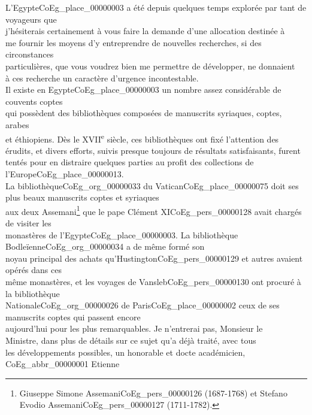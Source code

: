 \documentclass{book}
\begin{document}
\indent L’Egypte\gls{CoEg_place_00000003} a été depuis quelques temps explorée par tant de voyageurs que\\
j’hésiterais certainement à vous faire la demande d’une allocation destinée à\\
me fournir les moyens d’y entreprendre de nouvelles recherches, si des circonstances\\
particulières, que vous voudrez bien me permettre de développer, ne donnaient\\
à ces recherche un caractère d’urgence incontestable.\\
\indent Il existe en Egypte\gls{CoEg_place_00000003} un nombre assez considérable de couvents coptes\\
qui possèdent des bibliothèques composées de manuscrits syriaques, coptes, arabes\\
et éthiopiens. Dès le XVII\textsuperscript{e} siècle, ces bibliothèques ont fixé l’attention des\\
érudits, et divers efforts, suivis presque toujours de résultats satisfaisants, furent\\
tentés pour en distraire quelques parties au profit des collections de l’Europe\gls{CoEg_place_00000013}.\\
La bibliothèque\gls{CoEg_org_00000033} du Vatican\gls{CoEg_place_00000075} doit ses plus beaux manuscrits coptes et syriaques\\
aux deux Assemani\footnote{Giuseppe Simone Assemani\gls{CoEg_pers_00000126} (1687-1768) et Stefano Evodio Assemani\gls{CoEg_pers_00000127} (1711-1782).} que le pape Clément XI\gls{CoEg_pers_00000128} avait chargés de visiter les\\
monastères de l’Egypte\gls{CoEg_place_00000003}. La bibliothèque Bodleïenne\gls{CoEg_org_00000034} a de même formé son\\
noyau principal des achats qu’Hustington\gls{CoEg_pers_00000129} et autres avaient opérés dans ces\\
même monastères, et les voyages de Vansleb\gls{CoEg_pers_00000130} ont procuré à la bibliothèque\\
Nationale\gls{CoEg_org_00000026} de Paris\gls{CoEg_place_00000002} ceux de ses manuscrits coptes qui passent encore\\
aujourd’hui pour les plus remarquables. Je n’entrerai pas, Monsieur le\\
Ministre, dans plus de détails sur ce sujet qu’a déjà traité, avec tous\\
les développements possibles, un honorable et docte académicien, \gls{CoEg_abbr_00000001} Etienne\\
\end{document}
